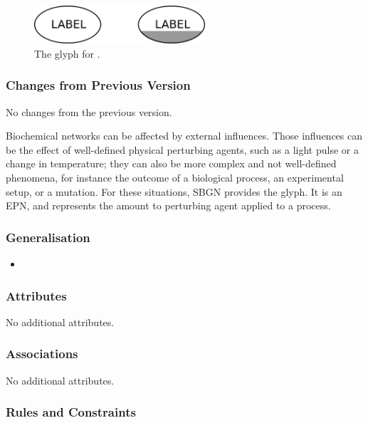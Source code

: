 \begin{figure}[htb]
  \centering
  \includegraphics[width=2.5in]{images/unspecified}
  \caption{The \PD glyph for .}
  \label{fig:techref:unspecified}
\end{figure}

\subsubsection{Changes from Previous Version}

No changes from the previous version.

\label{sec:techref:perturbing agent}

Biochemical networks can be affected by external influences.  Those
influences can be the effect of well-defined physical perturbing
agents, such as a light pulse or a change in temperature; they can
also be more complex and not well-defined phenomena, for instance the
outcome of a biological process, an experimental setup, or a mutation.
For these situations, SBGN provides the 
glyph. It is an EPN, and represents the amount to perturbing agent
applied to a process.

\subsubsection{Generalisation}

\begin{itemize}
\item {}
\end{itemize}

\subsubsection{Attributes}

No additional attributes.

\subsubsection{Associations}

No additional attributes.

\subsubsection{Rules and Constraints}

